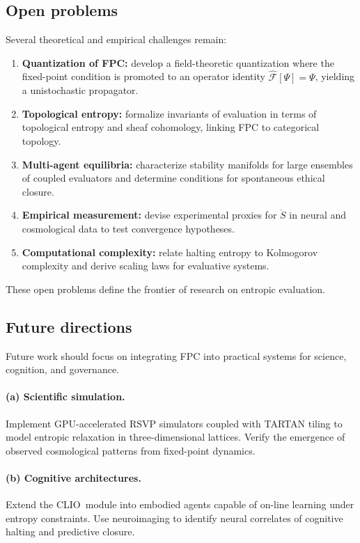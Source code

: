 \documentclass[12pt,a4paper]{article}
\newcommand{\CLIO}{CLIO}              %
\newcommand{\F}{\mathcal{F}}          %
\theoremstyle{plain}
\begin{document}
\subsection{Open problems}
Several theoretical and empirical challenges remain:

\begin{enumerate}[nosep]
  \item \textbf{Quantization of FPC:} develop a field-theoretic quantization where the fixed-point condition is promoted to an operator identity 
  $\hat{\F}[\Psi]=\Psi$, yielding a unistochastic propagator.
  \item \textbf{Topological entropy:} formalize invariants of evaluation in terms of topological entropy and sheaf cohomology, linking FPC to categorical topology.
  \item \textbf{Multi-agent equilibria:} characterize stability manifolds for large ensembles of coupled evaluators and determine conditions for spontaneous ethical closure.
  \item \textbf{Empirical measurement:} devise experimental proxies for $\dot{S}$ in neural and cosmological data to test convergence hypotheses.
  \item \textbf{Computational complexity:} relate halting entropy to Kolmogorov complexity and derive scaling laws for evaluative systems.
\end{enumerate}

These open problems define the frontier of research on entropic evaluation.

\subsection{Future directions}
Future work should focus on integrating FPC into practical systems for science, cognition, and governance.

\paragraph{(a) Scientific simulation.}
Implement GPU-accelerated RSVP simulators coupled with TARTAN tiling to model entropic relaxation in three-dimensional lattices.
Verify the emergence of observed cosmological patterns from fixed-point dynamics.

\paragraph{(b) Cognitive architectures.}
Extend the \CLIO\ module into embodied agents capable of on-line learning under entropy constraints.
Use neuroimaging to identify neural correlates of cognitive halting and predictive closure.
\end{document}
